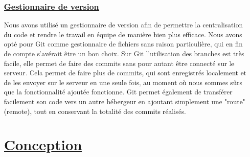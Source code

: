 \documentclass[12pt]{article}
\begin{document}
\subsubsection{\underline{Gestionnaire de version}}

	Nous avons utilisé un gestionnaire de version afin de permettre la centralisation du code et rendre le travail en équipe de manière bien plus efficace. Nous avons opté pour Git comme gestionnaire de fichiers sans raison particulière, qui en fin de compte s'avérait être un bon choix. Sur Git  l'utilisation des branches est très facile, elle permet de faire des commits sans pour autant être connecté sur le serveur. Cela permet de faire plus de commits, qui sont enregistrés localement et de les envoyer sur le serveur en une seule fois, au moment où nous sommes sûrs que la fonctionnalité ajoutée fonctionne. Git permet également de transférer facilement son code vers un autre hébergeur en ajoutant simplement une "route" (remote), tout en conservant la totalité des commits réalisés.




\section{\underline{Conception}}
\end{document}

